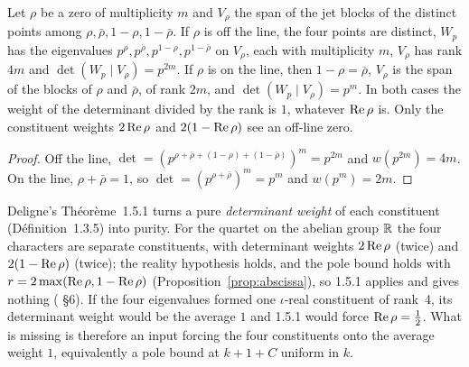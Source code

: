 \begin{proposition}\label{prop:avgweight}
Let $\rho$ be a zero of multiplicity $m$ and $V_\rho$ the span of the jet blocks of the distinct points among $\rho,\bar\rho,1-\rho,1-\bar\rho$. If $\rho$ is off the line, the four points are distinct, $W_p$ has the eigenvalues $p^\rho,p^{\bar\rho},p^{1-\rho},p^{1-\bar\rho}$ on $V_\rho$, each with multiplicity $m$, $V_\rho$ has rank $4m$ and $\det(W_p\mid V_\rho)=p^{2m}$. If $\rho$ is on the line, then $1-\rho=\bar\rho$, $V_\rho$ is the span of the blocks of $\rho$ and $\bar\rho$, of rank $2m$, and $\det(W_p\mid V_\rho)=p^{m}$. In both cases the weight of the determinant divided by the rank is $1$, whatever $\operatorname{Re}\rho$ is. Only the constituent weights $2\operatorname{Re}\rho$ and $2(1-\operatorname{Re}\rho)$ see an off-line zero.
\end{proposition}

\begin{proof}
Off the line, $\det=(p^{\rho+\bar\rho+(1-\rho)+(1-\bar\rho)})^m=p^{2m}$ and $w(p^{2m})=4m$. On the line, $\rho+\bar\rho=1$, so $\det=(p^{\rho+\bar\rho})^m=p^m$ and $w(p^m)=2m$.
\end{proof}

Deligne's Théorème~1.5.1 turns a pure \emph{determinant weight} of each constituent (Définition~1.3.5) into purity. For the quartet on the abelian group $\mathbb{R}$ the four characters are separate constituents, with determinant weights $2\operatorname{Re}\rho$ (twice) and $2(1-\operatorname{Re}\rho)$ (twice); the reality hypothesis holds, and the pole bound holds with $r=2\max(\operatorname{Re}\rho,1-\operatorname{Re}\rho)$ (Proposition~\ref{prop:abscissa}), so 1.5.1 applies and gives nothing ( §6). If the four eigenvalues formed one $\iota$-real constituent of rank~4, its determinant weight would be the average $1$ and 1.5.1 would force $\operatorname{Re}\rho=\tfrac12$. What is missing is therefore an input forcing the four constituents onto the average weight $1$, equivalently a pole bound at $k+1+C$ uniform in $k$.

